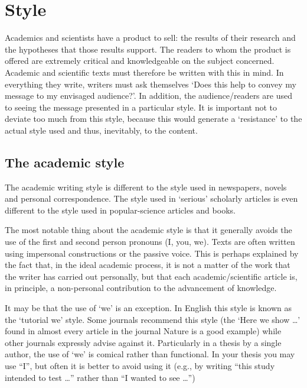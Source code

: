 
\section{Style}\label{sec:style}
Academics and scientists have a product to sell: the results of their research and the hypotheses that those results support.
The readers to whom the product is offered are extremely critical and knowledgeable on the subject concerned.
Academic and scientific texts must therefore be written with this in mind.
In everything they write, writers must ask themselves `Does this help to convey my message to my envisaged audience?'.
In addition, the audience/readers are used to seeing the message presented in a particular style.
It is important not to deviate too much from this style, because this would generate a `resistance' to the actual style used and thus, inevitably, to the content.

\subsection{The academic style}\label{sec:_academic_style}
The academic writing style is different to the style used in newspapers, novels and personal correspondence.
The style used in `serious' scholarly articles is even different to the style used in popular-science articles and books.

The most notable thing about the academic style is that it generally avoids the use of the first and second person pronouns (I, you, we).
Texts are often written using impersonal constructions or the passive voice.
This is perhaps explained by the fact that, in the ideal academic process, it is not a matter of the work that the writer has carried out personally, but that each academic/scientific article is, in principle, a non-personal contribution to the advancement of knowledge.

It may be that the use of `we' is an exception.
In English this style is known as the `tutorial we' style.
Some journals recommend this style (the `Here we show \ldots' found in almost every article in the journal Nature is a good example) while other journals expressly advise against it.
Particularly in a thesis by a single author, the use of `we' is comical rather than functional.
In your thesis you may use ``I'', but often it is better to avoid using it (e.g., by writing ``this study intended to test \ldots'' rather than ``I wanted to see \ldots'')

